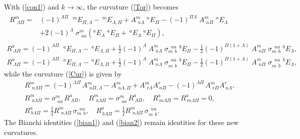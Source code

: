 \documentclass[a4paper,12pt]{article}
\newcommand{\La}{\ensuremath{\Lambda}}
\newcommand{\si}{\ensuremath{\sigma}}
\begin{document}
With (\ref{con1}) and $k\to\infty$, the curvature (\ref{Tor}) becomes
\begin{gather}
\begin{split}
R^m_{\ \,\La\Pi}=&(-1)^{\La\Pi}\;\;^m\!E_{\Pi,\La}-\,^m\!E_{\La,\Pi}+A^m_{\ \,n\La}\;^n\!E_\Pi-(-1)^{\Pi\La}\;A^m_{\ \,n\Pi}\;^n\!E_\La   \\
&+2(-1)^\La\;\si^m_{\ \,a\dot{a}}(^{\dot{a}}\!E_\La\;^a\!E_\Pi+\,^a\!E_\La\;^{\dot{a}}\!E_\Pi),  
\end{split} \label{Tora}  \\[8pt]
R^a_{\ \La\Pi}=(-1)^{\La\Pi}\;\;^a\!E_{\Pi,\La}-\,^a\!E_{\La,\Pi}+\frac{1}{2}(-1)^\La\;A^m_{\ \,n\La}\;\si_{m\ \ b}^{\ \;na}\;^b\!E_\Pi-\frac{1}{2}(-1)^{\Pi(1+\La)}\;A^m_{\ \,n\Pi}\;\si_{m\ \ b}^{\ \;na}\;^b\!E_\La, \label{Torb} \\
R^{\dot{a}}_{\ \La\Pi}=(-1)^{\La\Pi}\;\;^{\dot{a}}\!E_{\Pi,\La}-\,^{\dot{a}}\!E_{\La,\Pi}+\frac{1}{2}(-1)^\La\;A^m_{\ \,n\La}\;\si_{m\ \ \dot{b}}^{\ \;n\dot{a}}\;^{\dot{b}}\!E_\Pi-\frac{1}{2}(-1)^{\Pi(1+\La)}\;A^m_{\ \,n\Pi}\;\si_{m\ \ \dot{b}}^{\ \;n\dot{a}}\;^{\dot{b}}\!E_\La, \label{Torc}
\end{gather}
while the curvature (\ref{Cur}) is given by
\begin{gather}
R^m_{\ \,n\La\Pi}=(-1)^{\La\Pi}\,A^m_{\ \,n\Pi,\La}-A^m_{\ \,n\La,\Pi}+A^m_{\ \,r\La}A^r_{\ n\Pi}-(-1)^{\La\Pi}\,A^m_{\ \,r\Pi}A^r_{\ n\La}, \label{Cura} \\
R^m_{\ \,a\La\Pi}=\si^m_{\ \,a\dot{a}}\,R^{\dot{a}}_{\ \La\Pi}, \quad R^m_{\ \,\dot{a}\La\Pi}=\si^m_{\ \,a\dot{a}}\,R^a_{\ \La\Pi},
\quad R^{\dot{a}}_{\ m\La\Pi}=R^{\dot{a}}_{\ m\La\Pi}=0, \label{Curb} \\[8pt]
R^a_{\ b\La\Pi}=\frac{1}{2}R^m_{\ \,n\La\Pi}\,\si_{m\ \ b}^{\ \;na},  \quad R^{\dot{a}}_{\ \dot{b}\La\Pi}=\frac{1}{2}R^m_{\ \,n\La\Pi}\,\si_{m\ \ \dot{b}}^{\ \;n\dot{a}}.  \label{Curc}
\end{gather}
The Bianchi identities (\ref{bian1})  and (\ref{bian2}) remain identities for these new curvatures.
\end{document}
